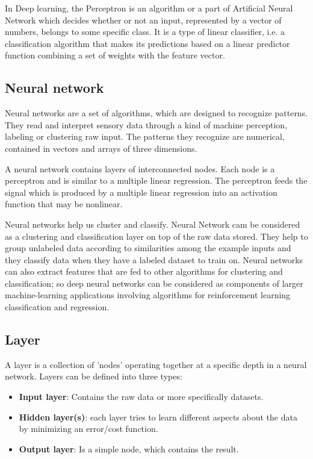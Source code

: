 In Deep learning, the Perceptron is an algorithm or a part of Artificial Neural Network which decides whether or not an input, represented by a vector of numbers, belongs to some specific class.
It is a type of linear classifier, i.e. a classification algorithm that makes its predictions based on a linear predictor function combining a set of weights with the feature vector. 


\subsection{Neural network}
Neural networks are a set of algorithms, which are designed to recognize patterns. They read and interpret sensory data through a kind of machine perception, labeling or clustering raw input. The patterns they recognize are numerical, contained in vectors and arrays of three dimensions.

\par A neural network contains layers of interconnected nodes. Each node is a perceptron and is similar to a multiple linear regression. The perceptron feeds the signal which is produced by a multiple linear regression into an activation function that may be nonlinear.

Neural networks help us cluster and classify. Neural Network cam be considered as a clustering and classification layer on top of the raw data stored. They help to group unlabeled data according to similarities among the example inputs and they classify data when they have a labeled dataset to train on. Neural networks can also extract features that are fed to other algorithms for clustering and classification; so deep neural networks can be considered as components of larger machine-learning applications involving algorithms for reinforcement learning classification and regression.



\subsection{Layer}
A layer is a collection of 'nodes' operating together at a specific depth in a neural network.
\newline
Layers can be defined into three types:
\begin{itemize}
    \item \textbf{Input layer}: Contains the raw data or more specifically datasets.
    \item \textbf{Hidden layer(s)}: each layer tries to learn different aspects about the data by minimizing an error/cost function.
    \item \textbf{Output layer}: Is a simple node, which contains the result.
\end{itemize}
